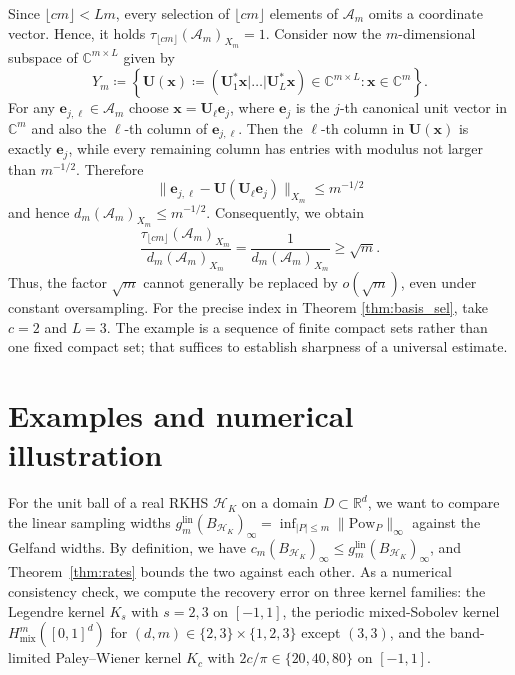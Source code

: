 \documentclass[11pt,reqno, a4paper]{article}
\numberwithin{equation}{section}
\newcommand{\R}{\mathbb{R}}
\newcommand{\C}{\mathbb{C}}
\newcommand{\lin}{\ensuremath{\mathrm{lin}}}
\begin{document}
Since \(\lfloor cm\rfloor<Lm\), every selection of \(\lfloor cm\rfloor\) elements of \(\mathcal A_m\) omits a coordinate vector.
Hence, it holds $\tau_{\lfloor cm\rfloor}(\mathcal A_m)_{X_m}=1$.
Consider now the \(m\)-dimensional subspace of $\C^{m\times L}$ given by 
\begin{equation}
    Y_m\coloneqq\left\{ \mathbf U(\mathbf x)\coloneqq (\mathbf U_1^*\mathbf x| \dots |\mathbf U_L^*\mathbf x) \in \C^{m\times L} : \mathbf x\in\mathbb C^m \right\}.
\end{equation}
For any \(\mathbf e_{j,\ell}\in \mathcal{A}_m\) choose \(\mathbf x=\mathbf U_\ell\mathbf e_j\), where $\mathbf e_j$ is the $j$-th canonical unit vector in $\C^m$ and also the $\ell$-th column of $\mathbf e_{j,\ell}$.
Then the \(\ell\)-th column in $\mathbf U(\mathbf x)$ is exactly \(\mathbf e_j\), while every remaining column has entries with  modulus not larger than \(m^{-1/2}\).
Therefore
\begin{equation}
    \|\mathbf e_{j,\ell}-\mathbf U(\mathbf U_{\ell}\mathbf e_j)\|_{X_m} \leq m^{-1/2}
\end{equation}
and hence $d_m(\mathcal A_m)_{X_m}\leq m^{-1/2}$.
Consequently, we obtain
\begin{equation}
    \frac{\tau_{\lfloor cm\rfloor}(\mathcal A_m)_{X_m}} {d_m(\mathcal A_m)_{X_m}} = \frac{1} {d_m(\mathcal A_m)_{X_m}} \geq \sqrt{m}.
\end{equation}
Thus, the factor \(\sqrt{m}\) cannot generally be replaced by \(o(\sqrt{m})\), even under constant oversampling.
For the precise index in Theorem \ref{thm:basis_sel}, take \(c=2\) and \(L=3\).
The example is a sequence of finite compact sets rather than one fixed compact set; that suffices to establish sharpness of a universal estimate.



\section{Examples and numerical illustration}\label{sec:numerics}
For the unit ball of a real RKHS $\mathcal H_K$ on a domain $D\subset\R^d$, we want to compare the linear sampling widths $g^{\lin}_m(B_{\mathcal H_K})_\infty=\inf_{|P|\le m}\|\mathrm{Pow}_P\|_\infty$ against the Gelfand widths.
By definition, we have $c_m(B_{\mathcal H_K})_\infty\le g^{\lin}_m(B_{\mathcal H_K})_\infty$, and Theorem~\ref{thm:rates} bounds the two against each other.
As a numerical consistency check, we compute the recovery error on three kernel families: the Legendre kernel $K_s$ with $s=2,3$ on $[-1,1]$, the periodic mixed-Sobolev kernel $H^m_{\mathrm{mix}}([0,1]^d)$ for $(d,m)\in\{2,3\}\times\{1,2,3\}$ except $(3,3)$, and the band-limited Paley--Wiener kernel $K_c$ with $2c/\pi\in\{20,40,80\}$ on $[-1,1]$.
\end{document}
